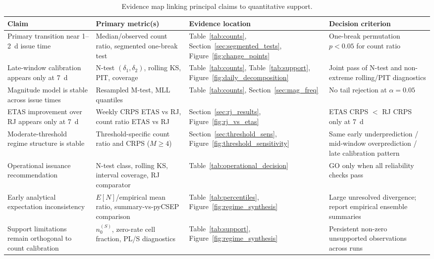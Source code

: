 \documentclass[12pt,letterpaper]{article}
\begin{document}
\begin{table}[ht]
\centering
\small
\caption{Evidence map linking principal claims to quantitative support.}
\label{tab:evidence_map}
\begin{tabular}{p{3.8cm}p{4.1cm}p{3.2cm}p{2.8cm}}
\toprule
Claim & Primary metric(s) & Evidence location & Decision criterion \\
\midrule
Primary transition near 1--2~d issue time & Median/observed count ratio, segmented one-break test & Table~\ref{tab:counts}, Section~\ref{sec:segmented_tests}, Figure~\ref{fig:change_points} & One-break permutation $p<0.05$ for count ratio \\
Late-window calibration appears only at 7~d & N-test $(\delta_1,\delta_2)$, rolling KS, PIT, coverage & Table~\ref{tab:counts}, Table~\ref{tab:support}, Figure~\ref{fig:daily_decomposition} & Joint pass of N-test and non-extreme rolling/PIT diagnostics \\
Magnitude model is stable across issue times & Resampled M-test, MLL quantiles & Table~\ref{tab:counts}, Section~\ref{sec:mag_freq} & No tail rejection at $\alpha=0.05$ \\
ETAS improvement over RJ appears only at 7~d & Weekly CRPS ETAS vs RJ, count ratio ETAS vs RJ & Section~\ref{sec:rj_results}, Figure~\ref{fig:rj_vs_etas} & ETAS CRPS $<$ RJ CRPS only at 7~d \\
Moderate-threshold regime structure is stable & Threshold-specific count ratio and CRPS ($M\geq4$) & Section~\ref{sec:threshold_sens}, Figure~\ref{fig:threshold_sensitivity} & Same early underprediction / mid-window overprediction / late calibration pattern \\
Operational issuance recommendation & N-test class, rolling KS, interval coverage, RJ comparator & Table~\ref{tab:operational_decision} & GO only when all reliability checks pass \\
Early analytical expectation inconsistency & $E[N]$/empirical mean ratio, summary-vs-pyCSEP comparison & Table~\ref{tab:percentiles}, Figure~\ref{fig:regime_synthesis} & Large unresolved divergence; report empirical ensemble summaries \\
Support limitations remain orthogonal to count calibration & $n^{(S)}_0$, zero-rate cell fraction, PL/S diagnostics & Table~\ref{tab:support}, Figure~\ref{fig:regime_synthesis} & Persistent non-zero unsupported observations across runs \\
\bottomrule
\end{tabular}
\end{table}
\end{document}
